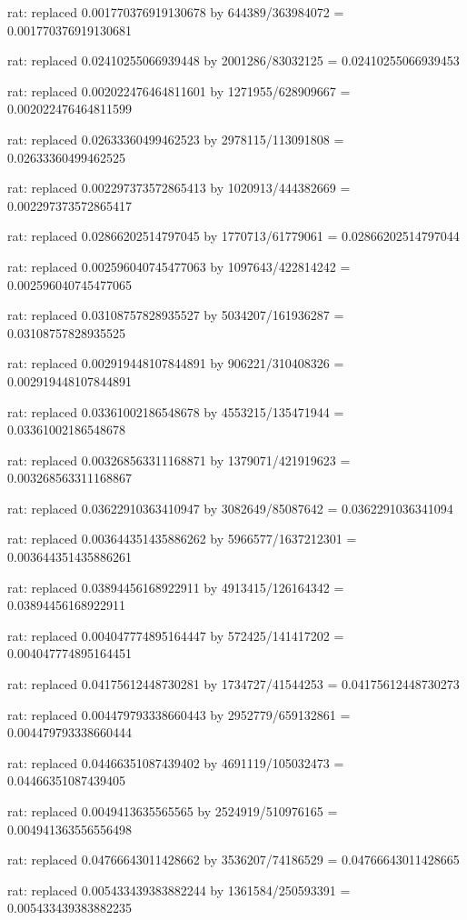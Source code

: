 \documentclass[a4paper,10pt]{article}
\begin{document}
\begin{eulernotebook}
\begin{eulercomment}
\begin{eulercomment}
\begin{eulercomment}
\begin{eulercomment}
\begin{eulercomment}
\begin{eulercomment}
\begin{eulercomment}
\begin{eulercomment}
\begin{eulercomment}
\begin{eulercomment}
\begin{eulercomment}
\begin{eulercomment}
\begin{eulercomment}
\begin{eulercomment}
\begin{eulercomment}
\begin{eulercomment}
\begin{euleroutput}
  rat: replaced 0.001770376919130678 by 644389/363984072 = 0.001770376919130681
  
  rat: replaced 0.02410255066939448 by 2001286/83032125 = 0.02410255066939453
  
  rat: replaced 0.002022476464811601 by 1271955/628909667 = 0.002022476464811599
  
  rat: replaced 0.02633360499462523 by 2978115/113091808 = 0.02633360499462525
  
  rat: replaced 0.002297373572865413 by 1020913/444382669 = 0.002297373572865417
  
  rat: replaced 0.02866202514797045 by 1770713/61779061 = 0.02866202514797044
  
  rat: replaced 0.002596040745477063 by 1097643/422814242 = 0.002596040745477065
  
  rat: replaced 0.03108757828935527 by 5034207/161936287 = 0.03108757828935525
  
  rat: replaced 0.002919448107844891 by 906221/310408326 = 0.002919448107844891
  
  rat: replaced 0.03361002186548678 by 4553215/135471944 = 0.03361002186548678
  
  rat: replaced 0.003268563311168871 by 1379071/421919623 = 0.003268563311168867
  
  rat: replaced 0.03622910363410947 by 3082649/85087642 = 0.0362291036341094
  
  rat: replaced 0.003644351435886262 by 5966577/1637212301 = 0.003644351435886261
  
  rat: replaced 0.03894456168922911 by 4913415/126164342 = 0.03894456168922911
  
  rat: replaced 0.004047774895164447 by 572425/141417202 = 0.004047774895164451
  
  rat: replaced 0.04175612448730281 by 1734727/41544253 = 0.04175612448730273
  
  rat: replaced 0.004479793338660443 by 2952779/659132861 = 0.004479793338660444
  
  rat: replaced 0.04466351087439402 by 4691119/105032473 = 0.04466351087439405
  
  rat: replaced 0.0049413635565565 by 2524919/510976165 = 0.004941363556556498
  
  rat: replaced 0.04766643011428662 by 3536207/74186529 = 0.04766643011428665
  
  rat: replaced 0.005433439383882244 by 1361584/250593391 = 0.005433439383882235
  

\end{euleroutput}
\end{eulercomment}
\end{eulercomment}
\end{eulercomment}
\end{eulercomment}
\end{eulercomment}
\end{eulercomment}
\end{eulercomment}
\end{eulercomment}
\end{eulercomment}
\end{eulercomment}
\end{eulercomment}
\end{eulercomment}
\end{eulercomment}
\end{eulercomment}
\end{eulercomment}
\end{eulercomment}
\end{eulernotebook}
\end{document}
